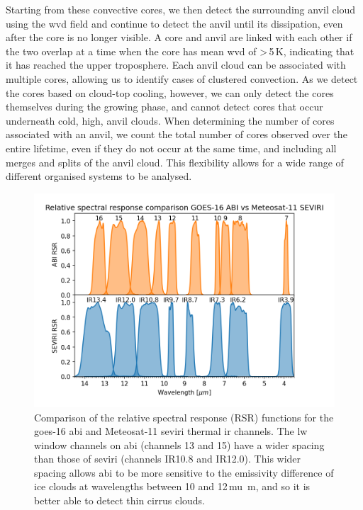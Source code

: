 Starting from these convective cores, we then detect the surrounding anvil cloud using the \acrshort{wvd} field \citep{muller_role_2018, muller_novel_2019} and continue to detect the anvil until its dissipation, even after the core is no longer visible. 
A core and anvil are linked with each other if the two overlap at a time when the core has mean \acrshort{wvd} of \textgreater\,5\,\unit{K}, indicating that it has reached the upper troposphere.
Each anvil cloud can be associated with multiple cores, allowing us to identify cases of clustered convection. 
As we detect the cores based on cloud-top cooling, however, we can only detect the cores themselves during the growing phase, and cannot detect cores that occur underneath cold, high, anvil clouds.
When determining the number of cores associated with an anvil, we count the total number of cores observed over the entire lifetime, even if they do not occur at the same time, and including all merges and splits of the anvil cloud.
This flexibility allows for a wide range of different organised systems to be analysed.

\begin{figure}[tp]
    \includegraphics[width=\textwidth]{figures/chapter4_05.png}
    \caption[
    Comparison of the relative spectral response (RSR) functions for the \acrshort{goes}-16 \acrshort{abi} and Meteosat-11 \acrshort{seviri} thermal \acrshort{ir} channels
    ]{
    Comparison of the relative spectral response (RSR) functions for the \acrshort{goes}-16 \acrshort{abi} and Meteosat-11 \acrshort{seviri} thermal \acrshort{ir} channels. The \acrshort{lw} window channels on \acrshort{abi} (channels 13 and 15) have a wider spacing than those of \acrshort{seviri} (channels IR10.8 and IR12.0). This wider spacing allows \acrshort{abi} to be more sensitive to the emissivity difference of ice clouds at wavelengths between 10 and 12\,\unit{mu m}, and so it is better able to detect thin cirrus clouds.}
    \label{fig:S_abi_seviri_rsr}
\end{figure}


